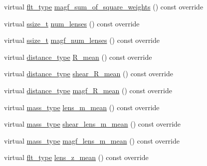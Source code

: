 \begin{DoxyCompactItemize}
\item 
virtual \hyperlink{lib_2IceBRG__main_2common_8h_ad0f130a56eeb944d9ef2692ee881ecc4}{flt\+\_\+type} \hyperlink{classIceBRG_1_1pair__bin_a02143e3b6f9204926745bd7c75e98d11}{magf\+\_\+sum\+\_\+of\+\_\+square\+\_\+weights} () const  override
\item 
virtual \hyperlink{lib_2IceBRG__main_2common_8h_ab322a3e50421dc5f0c43316b1b373592}{ssize\+\_\+t} \hyperlink{classIceBRG_1_1pair__bin_aee678cef9bc814e397086d1a0c538eda}{num\+\_\+lenses} () const  override
\item 
virtual \hyperlink{lib_2IceBRG__main_2common_8h_ab322a3e50421dc5f0c43316b1b373592}{ssize\+\_\+t} \hyperlink{classIceBRG_1_1pair__bin_a3f5e9c027d8b7a59b0eed96b945ed359}{magf\+\_\+num\+\_\+lenses} () const  override
\item 
virtual \hyperlink{namespaceIceBRG_a45499647eb87e24c10ab32c628711cec}{distance\+\_\+type} \hyperlink{classIceBRG_1_1pair__bin_a389bb8e9c0f6b404f355770c535e0c7b}{R\+\_\+mean} () const  override
\item 
virtual \hyperlink{namespaceIceBRG_a45499647eb87e24c10ab32c628711cec}{distance\+\_\+type} \hyperlink{classIceBRG_1_1pair__bin_a0f1c2ad394544e29c678860edd67f647}{shear\+\_\+\+R\+\_\+mean} () const  override
\item 
virtual \hyperlink{namespaceIceBRG_a45499647eb87e24c10ab32c628711cec}{distance\+\_\+type} \hyperlink{classIceBRG_1_1pair__bin_a2a1bdc144ec98c4076e4b4c6b3256669}{magf\+\_\+\+R\+\_\+mean} () const  override
\item 
virtual \hyperlink{namespaceIceBRG_a1be72ac4918a9b029f2eefa084213e35}{mass\+\_\+type} \hyperlink{classIceBRG_1_1pair__bin_aa0f1d66043ee54ea3ee8786d91d921ad}{lens\+\_\+m\+\_\+mean} () const  override
\item 
virtual \hyperlink{namespaceIceBRG_a1be72ac4918a9b029f2eefa084213e35}{mass\+\_\+type} \hyperlink{classIceBRG_1_1pair__bin_abd50dd7d2630987a59f918b165dcec1e}{shear\+\_\+lens\+\_\+m\+\_\+mean} () const  override
\item 
virtual \hyperlink{namespaceIceBRG_a1be72ac4918a9b029f2eefa084213e35}{mass\+\_\+type} \hyperlink{classIceBRG_1_1pair__bin_a107f55b9767dd7686831d27cb8a92519}{magf\+\_\+lens\+\_\+m\+\_\+mean} () const  override
\item 
virtual \hyperlink{lib_2IceBRG__main_2common_8h_ad0f130a56eeb944d9ef2692ee881ecc4}{flt\+\_\+type} \hyperlink{classIceBRG_1_1pair__bin_a5b866e77dbc3e8940fe6b38cff0797ed}{lens\+\_\+z\+\_\+mean} () const  override
\item 

\end{DoxyCompactItemize}
